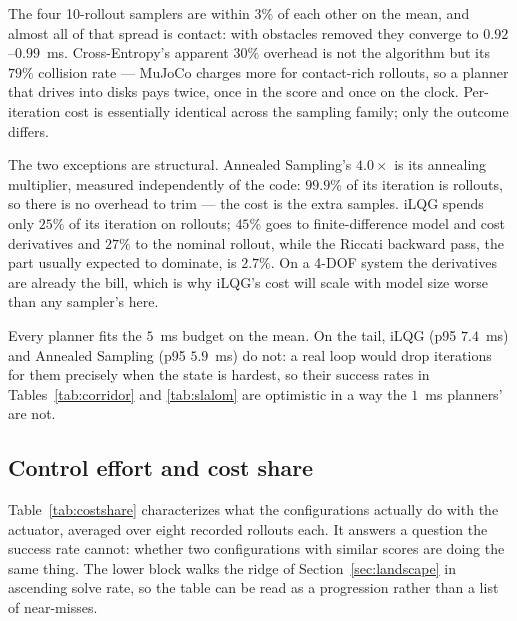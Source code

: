 \documentclass[conference]{IEEEtran}
\newcounter{algo}
\begin{document}
The four 10-rollout samplers are within $3\%$ of each other on the mean, and
almost all of that spread is contact: with obstacles removed they converge to
$0.92$--$0.99$~ms. Cross-Entropy's apparent $30\%$ overhead is not the algorithm
but its $79\%$ collision rate --- MuJoCo charges more for contact-rich rollouts,
so a planner that drives into disks pays twice, once in the score and once on the
clock. Per-iteration cost is essentially identical across the sampling family;
only the outcome differs.

The two exceptions are structural. Annealed Sampling's $4.0\times$ is its
annealing multiplier, measured independently of the code: $99.9\%$ of its
iteration is rollouts, so there is no overhead to trim --- the cost is the extra
samples. iLQG spends only $25\%$ of its iteration on rollouts; $45\%$ goes to
finite-difference model and cost derivatives and $27\%$ to the nominal rollout,
while the Riccati backward pass, the part usually expected to dominate, is
$2.7\%$. On a 4-DOF system the derivatives are already the bill, which is why
iLQG's cost will scale with model size worse than any sampler's here.

Every planner fits the $5$~ms budget on the mean. On the tail, iLQG (p95
$7.4$~ms) and Annealed Sampling (p95 $5.9$~ms) do not: a real loop would drop
iterations for them precisely when the state is hardest, so their success rates
in Tables~\ref{tab:corridor} and \ref{tab:slalom} are optimistic in a way the
$1$~ms planners' are not.

\subsection{Control effort and cost share}
\label{sec:costshare}

Table~\ref{tab:costshare} characterizes what the configurations actually do with
the actuator, averaged over eight recorded rollouts each. It answers a question
the success rate cannot: whether two configurations with similar scores are
doing the same thing. The lower block walks the ridge of
Section~\ref{sec:landscape} in ascending solve rate, so the table can be read as
a progression rather than a list of near-misses.
\end{document}
